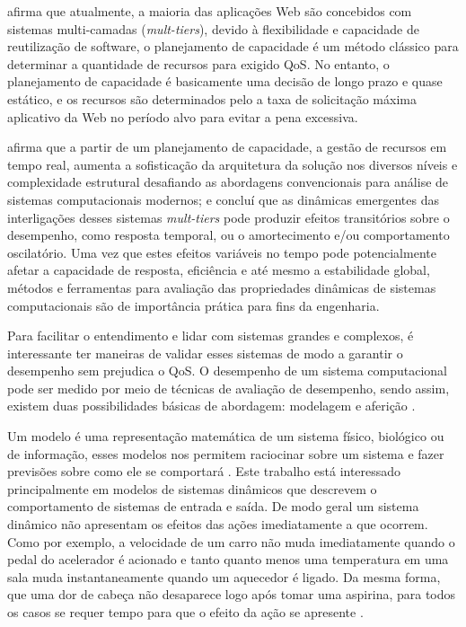 \cite{Dong2014} afirma que atualmente, a maioria das aplicações Web são concebidos com sistemas multi-camadas (\textit{mult-tiers}), devido à flexibilidade e capacidade de reutilização de software, o planejamento de capacidade é um método clássico para determinar a quantidade de recursos para exigido QoS. No entanto, o planejamento de capacidade é basicamente uma decisão de longo prazo e quase estático, e os recursos são determinados pelo a taxa de solicitação máxima aplicativo da Web no período alvo para evitar a pena excessiva.

\cite{Lourenco2015} afirma que a partir de um planejamento de capacidade, a gestão de recursos em tempo real, aumenta a sofisticação da arquitetura da solução nos diversos níveis e complexidade estrutural desafiando as abordagens convencionais para análise de sistemas computacionais modernos; e concluí que as dinâmicas emergentes das interligações desses sistemas \textit{mult-tiers} pode produzir efeitos transitórios sobre o desempenho, como resposta temporal, ou o amortecimento e/ou comportamento oscilatório. Uma vez que estes efeitos variáveis no tempo pode potencialmente afetar a capacidade de resposta, eficiência e até mesmo a estabilidade global, métodos e ferramentas para avaliação das propriedades dinâmicas de sistemas computacionais são de importância prática para fins da engenharia.

Para facilitar o entendimento e lidar com sistemas grandes e complexos, é interessante ter maneiras de validar esses sistemas de modo a garantir o desempenho sem prejudica o QoS. O desempenho de um sistema computacional pode ser medido por meio de técnicas de avaliação de desempenho, sendo assim, existem duas possibilidades básicas de abordagem: modelagem e aferição \cite{Jain1991}.

Um modelo é uma representação matemática de um sistema físico, biológico ou de informação, esses modelos nos permitem raciocinar sobre um sistema e fazer previsões sobre como ele se comportará \cite{Karl2008}. Este trabalho está interessado principalmente em modelos de sistemas dinâmicos que descrevem o comportamento de sistemas de entrada e saída. De modo geral um sistema dinâmico não apresentam os efeitos das ações imediatamente a que ocorrem. Como por exemplo, a velocidade de um carro não muda imediatamente quando o pedal do acelerador é acionado e tanto quanto menos uma temperatura em uma sala muda instantaneamente quando um aquecedor é ligado. Da mesma forma, que uma dor de cabeça não desaparece logo após tomar uma aspirina, para todos os casos se requer tempo para que o efeito da ação se apresente \cite{Karl2008}.

